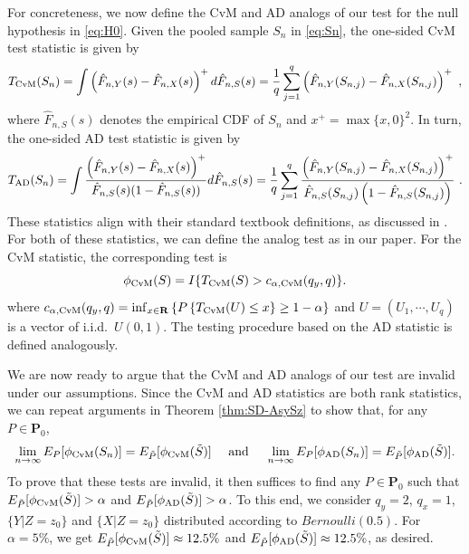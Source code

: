 \documentclass[11pt]{article}
\numberwithin{equation}{section}
\begin{document}
For concreteness, we now define the CvM and AD analogs of our test for the null hypothesis in \eqref{eq:H0}. Given the pooled sample $S_n$ in \eqref{eq:Sn}, the one-sided CvM test statistic is given by 
\begin{equation}\label{eq:cvm-stat}
  T_{\rm CvM}(S_n) =\int \left( \hat F_{n,Y}(s) - \hat F_{n,X}(s) \right)^{+}d\hat F_{n,S}(s) = \frac{1}{q}\sum_{j=1}^{q}\left( \hat F_{n,Y}(S_{n,j}) - \hat F_{n,X}(S_{n,j})\right)^{+}~,
\end{equation}
where $\hat{F}_{n,S}(s)$ denotes the empirical CDF of $S_n$ and $x^{+} = \max\{x, 0\}^2$. In turn, the one-sided AD test statistic is given by
\begin{equation}\label{eq:ad-stat}
    T_{\rm AD}(S_n) = \int \frac{\left( \hat{F}_{n,Y}(s) -\hat{F}_{n,X}(s) \right)^{+} }{\hat{F}_{n,S}(s)( 1-\hat{F}_{n,S}(s))} d\hat{F}_{n,S}(s) = \frac{1}{q}\sum_{j=1}^q \frac{\left( \hat{F}_{n,Y}(S_{n,j}) -\hat{F}_{n,X}(S_{n,j}) \right)^{+} }{\hat{F}_{n,S}(S_{n,j}) \left( 1-\hat{F}_{n,S}(S_{n,j}) \right) }~.
\end{equation}
These statistics align with their standard textbook definitions, as discussed in \citet[][p. 101]{hajek/sidak/sen:99}. For both of these statistics, we can define the analog test as in our paper. For the CvM statistic, the corresponding test is 
\begin{equation}\label{eq:cvm-test}
    \phi_{\rm CvM}(S)=I\{T_{\rm CvM}(S)>c_{\alpha,{\rm CvM}}(q_y, q)\} .
\end{equation}
where $c_{\alpha,{\rm CvM}}(q_y,q) = \inf_{x\in\mathbf R}\left\lbrace P\left\lbrace T_{\rm CvM}(U) \le x \right\rbrace\ge 1-\alpha \right\rbrace $ and $U=(U_1, \cdots, U_q)$ is a vector of i.i.d.\ $U(0,1)$. The testing procedure based on the AD statistic is defined analogously.

We are now ready to argue that the CvM and AD analogs of our test are invalid under our assumptions. Since the CvM and AD statistics are both rank statistics, we can repeat arguments in Theorem \ref{thm:SD-AsySz} to show that, for any $P \in \mathbf P_{0}$,
\begin{align*}
\lim_{n \to \infty} E_{P}[\phi_{\rm CvM} (S_{n})]  = E_{\tilde{P}}[\phi_{\rm CvM} (\tilde{S})]~~~\text{ and }~~~\lim_{n \to \infty} E_{P}[\phi_{\rm AD} (S_{n})]  = E_{\tilde{P}}[\phi_{\rm AD} (\tilde{S})].
\end{align*}
To prove that these tests are invalid, it then suffices to find any $P \in \mathbf P_{0}$ such that $E_{\tilde{P}}[\phi_{\rm CvM} (\tilde{S})]>\alpha$ and $E_{\tilde{P}}[\phi_{\rm AD} (\tilde{S})]>\alpha$. To this end, we consider $q_y=2$, $q_x=1$, $\{Y|Z=z_0\}$ and $\{X|Z=z_0\}$ distributed according to $Bernoulli(0.5)$. For $\alpha = 5\%$, we get $E_{\tilde{P}}[\phi_{\rm CvM} (\tilde{S})] \approx 12.5\%$ and $E_{\tilde{P}}[\phi_{\rm AD} (\tilde{S})] \approx 12.5\%$, as desired.
\end{document}
